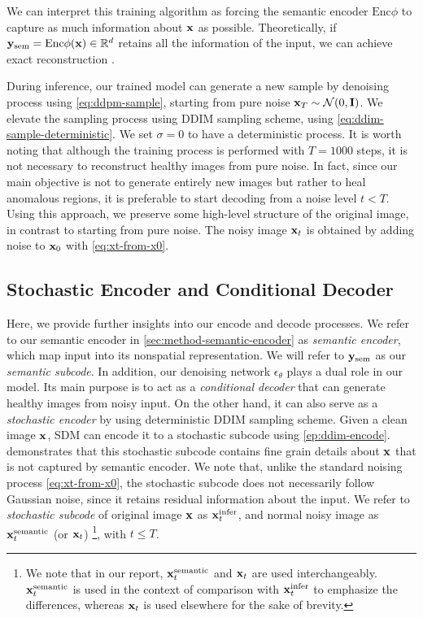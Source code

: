 We can interpret this training algorithm as forcing the semantic encoder $\mathrm{Enc}\phi$ to capture as much information about ${\mathbf{x}}$ as possible. Theoretically, if ${\mathbf{y}}_{\text{sem}} = \mathrm{Enc}\phi({\mathbf{x}}) \in \mathbb{R}^d$ retains all the information of the input, we can achieve exact reconstruction \cite{lozuponeLDAE2025}. 

During inference, our trained model can generate a new sample by denoising process using \cref{eq:ddpm-sample}, starting from pure noise ${\mathbf{x}}_T \sim \mathcal{N}(0, \mathbf{I})$. We elevate the sampling process using DDIM sampling scheme, using \cref{eq:ddim-sample-deterministic}. We set $\sigma=0$ to have a deterministic process. It is worth noting that although the training process is performed with $T = 1000$ steps, it is not necessary to reconstruct healthy images from pure noise. In fact, since our main objective is not to generate entirely new images but rather to heal anomalous regions, it is preferable to start decoding from a noise level $t < T$. Using this approach, we preserve some high-level structure of the original image, in contrast to starting from pure noise. The noisy image ${\mathbf{x}}_t$ is obtained by adding noise to ${\mathbf{x}}_0$ with \cref{eq:xt-from-x0}.

\subsection{Stochastic Encoder and Conditional Decoder}

Here, we provide further insights into our encode and decode processes. We refer to our semantic encoder in \cref{sec:method-semantic-encoder} as \emph{semantic encoder}, which map input into its nonspatial representation. We will refer to ${\mathbf{y}}_{\text{sem}}$ as our \emph{semantic subcode}. In addition, our denoising network $\epsilon_\theta$ plays a dual role in our model. Its main purpose is to act as a \emph{conditional decoder} that can generate healthy images from noisy input. On the other hand, it can also serve as a \emph{stochastic encoder} by using deterministic DDIM sampling scheme. Given a clean image ${\mathbf{x}}$, SDM can encode it to a stochastic subcode using \cref{ep:ddim-encode}. \cite{DiffAE, lozuponeLDAE2025} demonstrates that this stochastic subcode contains fine grain details about ${\mathbf{x}}$ that is not captured by semantic encoder. We note that, unlike the standard noising process \cref{eq:xt-from-x0}, the stochastic subcode does not necessarily follow Gaussian noise, since it retains residual information about the input. We refer to \emph{stochastic subcode} of original image ${\mathbf{x}}$ as ${\mathbf{x}}_t^{\mathrm{infer}}$, and normal noisy image as ${\mathbf{x}}_t^{\textrm{semantic}}$ (or ${\mathbf{x}}_t$) \footnote{We note that in our report, ${\mathbf{x}}_t^{\text{semantic}}$ and ${\mathbf{x}}_t$ are used interchangeably. ${\mathbf{x}}_t^{\text{semantic}}$ is used in the context of comparison with ${\mathbf{x}}_t^{\text{infer}}$ to emphasize the differences, whereas ${\mathbf{x}}_t$ is used elsewhere for the sake of brevity.}, with $t \leq T$. 


